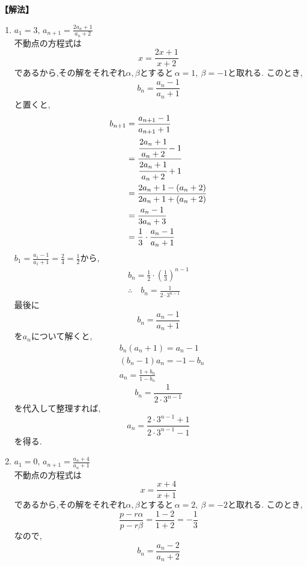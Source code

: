 \noindent\textbf{【解法】}
\begin{enumerate}[label=(\arabic*),parsep=3pt]
  \item $\displaystyle a_1=3,\, a_{n+1}=\frac{2a_n+1}{a_n+2}$\\
        不動点の方程式は
        \[
          x=\frac{2x+1}{x+2}
        \]
        であるから,その解をそれぞれ$\alpha,\beta$とすると\,$\alpha=1,\ \beta=-1$と取れる.
        このとき,
        \[
          b_n=\frac{a_n-1}{a_n+1}
        \]
        と置くと,
        \begin{align*}
          b_{n+1} & =\frac{a_{n+1}-1}{a_{n+1}+1}                              \\
                  & =\cfrac{\cfrac{2a_n+1}{a_n+2}-1}{\cfrac{2a_n+1}{a_n+2}+1} \\
                  & =\frac{2a_n+1-(a_n+2)}{2a_n+1+(a_n+2)}                    \\
                  & =\frac{a_n-1}{3a_n+3}                                     \\
                  & =\frac{1}{3}\cdot \frac{a_n-1}{a_n+1}
        \end{align*}
        $\displaystyle b_1=\frac{a_1-1}{a_1+1}=\frac{2}{4}=\frac{1}{2}$から,
        \begin{align*}
          b_{n}=\frac{1}{2}\cdot\left(\frac{1}{3}\right)^{n-1} \\
          \therefore \quad b_n=\frac{1}{2\cdot3^{n-1}}
        \end{align*}
        最後に
        \[
          b_n=\frac{a_n-1}{a_n+1}
        \]
        を$a_n$について解くと,
        \begin{align*}
           & b_n(a_n+1)=a_n-1        \\
           & (b_n-1)a_n=-1-b_n       \\
           & a_n=\frac{1+b_n}{1-b_n}
        \end{align*}
        \[
          b_n=\frac{1}{2\cdot3^{n-1}}
        \]
        を代入して整理すれば,
        \[
          a_n=\frac{2\cdot3^{n-1}+1}{2\cdot3^{n-1}-1}
        \]
        を得る.
  \item $\displaystyle a_1=0,\, a_{n+1}=\frac{a_n+4}{a_n+1}$\\
        不動点の方程式は
        \[
          x=\frac{x+4}{x+1}
        \]
        であるから,その解をそれぞれ$\alpha,\beta$とすると\,$\alpha=2,\ \beta=-2$と取れる.
        このとき,
        \[
          \frac{p-r\alpha}{p-r\beta}=\frac{1-2}{1+2}=-\frac13
        \]
        なので,
        \[
          b_n=\frac{a_n-2}{a_n+2}
\]
\end{enumerate}
